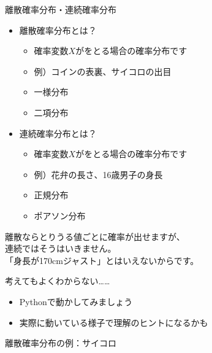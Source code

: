 \documentclass[dvipdfmx,cjk]{beamer}
\begin{document}
\begin{frame}{離散確率分布・連続確率分布}

\begin{itemize}

    \item 離散確率分布とは？
        \begin{itemize}
        \item 確率変数$X$がをとる場合の確率分布です
        \item 例）コインの表裏、サイコロの出目
        \item 一様分布
        \item 二項分布
        \end{itemize}

    \item 連続確率分布とは？
        \begin{itemize}
        \item 確率変数$X$がをとる場合の確率分布です
        \item 例）花弁の長さ、16歳男子の身長
        \item 正規分布
        \item ポアソン分布
        \end{itemize}

\end{itemize}

\vskip 1cm

離散ならとりうる値ごとに確率が出せますが、\\
連続ではそうはいきません。\\
「身長が170cmジャスト」とはいえないからです。

\end{frame}


\begin{frame}{考えてもよくわからない……}

\begin{itemize}
    \item Pythonで動かしてみましょう
    \item 実際に動いている様子で理解のヒントになるかも
\end{itemize}

\end{frame}


\begin{frame}{離散確率分布の例：サイコロ}


\end{frame}
\end{document}
